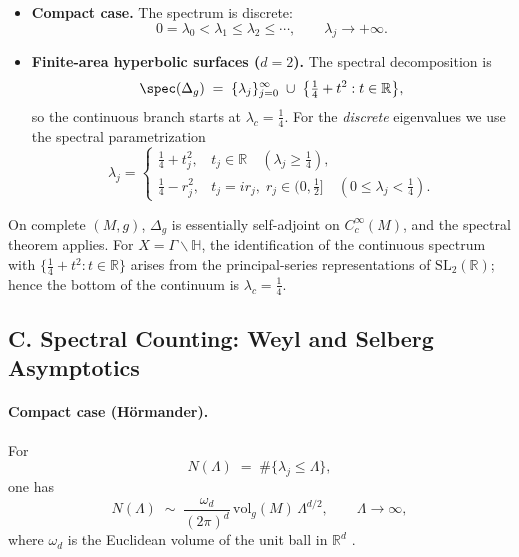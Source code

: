 \begin{itemize}

  \item \textbf{Compact case.}
        The spectrum is discrete:
        \[
          0=\lambda_0 < \lambda_1 \le \lambda_2 \le \cdots,\qquad \lambda_j\to+\infty.
        \]

  \item \textbf{Finite-area hyperbolic surfaces ($d=2$).}
        The spectral decomposition is
        \[
           \spec(\Delta_g)
           \;=\;
           \{\lambda_j\}_{j=0}^\infty
           \;\cup\;
           \big\{\tfrac14 + t^2 : t\in\mathbb{R}\big\},
        \]
        so the continuous branch starts at $\lambda_c=\tfrac14$. For the \emph{discrete} eigenvalues we use the spectral parametrization
        \[
           \lambda_j=
           \begin{cases}
              \tfrac14 + t_j^2, & t_j\in\mathbb{R}  \quad (\lambda_j\ge\tfrac14),\\[4pt]
              \tfrac14 - r_j^2, & t_j=i r_j,\; r_j\in(0,\tfrac12] \quad (0\le\lambda_j<\tfrac14).
           \end{cases}
        \]

\end{itemize}

\begin{remark}[Essential self-adjointness and the threshold \texorpdfstring{$\lambda_c=\tfrac14$}{lambda\_c=1/4}]
On complete $(M,g)$, $\Delta_g$ is essentially self-adjoint on $C_c^\infty(M)$, and the spectral theorem applies.
For $X=\Gamma\backslash\mathbb{H}$, the identification of the continuous spectrum with $\{\tfrac14+t^2: t\in\mathbb{R}\}$
arises from the principal-series representations of $\mathrm{SL}_2(\mathbb{R})$; hence the bottom of the continuum is $\lambda_c=\tfrac14$.
\end{remark}

\subsection*{C. Spectral Counting: Weyl and Selberg Asymptotics}
\label{subsec:weyl}

\paragraph{Compact case (Hörmander).}
For
\[
   N(\Lambda) \;=\; \#\{\lambda_j \le \Lambda\},
\]
one has
\[
   N(\Lambda) \;\sim\; \frac{\omega_d}{(2\pi)^d}\,\mathrm{vol}_g(M)\,\Lambda^{d/2},
   \qquad \Lambda\to\infty,
\]
where $\omega_d$ is the Euclidean volume of the unit ball in $\mathbb{R}^d$ \cite{Hormander1968}.

